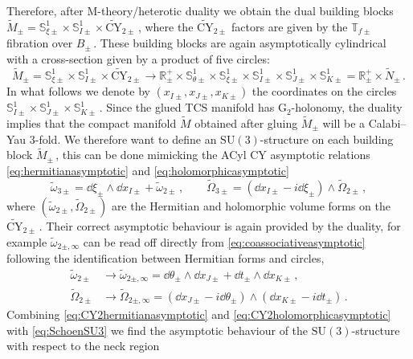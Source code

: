 \documentclass{pspum-l}
\newcommand*\Sc{\mathbb{S}}
\newcommand*\R{\mathbb{R}}
\theoremstyle{definition}
\theoremstyle{remark}
\numberwithin{equation}{section}
\begin{document}
Therefore, after M-theory/heterotic duality we obtain the dual building blocks $\widetilde{M}_\pm = \Sc^1_{\xi\pm}\times \Sc^1_{I\pm} \times \widetilde{\text{CY}}_{2\pm} \,$, where the $\widetilde{\text{CY}}_{2\pm}$ factors are given by the $\mathbb{T}_{f\pm}$ fibration over $B_\pm\,$. These building blocks are again asymptotically cylindrical with a cross-section given by a product of five circles:
\begin{equation}
    \widetilde{M}_\pm = \Sc^1_{\xi\pm}\times \Sc^1_{I\pm} \times \widetilde{\text{CY}}_{2\pm} \longrightarrow \R^+_\pm\times\Sc^1_{\theta\pm}\times\Sc^1_{\xi\pm}\times\Sc^1_{I\pm}\times\Sc^1_{J\pm}\times\Sc^1_{K\pm}= \R^+_\pm\times \widetilde{N}_\pm \, .
\end{equation}
In what follows we denote by $(x_{I\pm},x_{J\pm},x_{K\pm})$ the coordinates on the circles $\Sc^1_{I\pm}\times\Sc^1_{J\pm}\times\Sc^1_{K\pm}\,$. Since the glued TCS manifold has G$_2$-holonomy, the duality implies that the compact manifold $\widetilde{M}$ obtained after gluing $\widetilde{M}_\pm$ will be a Calabi--Yau 3-fold. We therefore want to define an $\text{SU}(3)$-structure on each building block $\widetilde{M}_\pm\,$, this can be done mimicking the ACyl CY asymptotic relations \eqref{eq:hermitianasymptotic} and \eqref{eq:holomorphicasymptotic}
\begin{equation}
\label{eq:SchoenSU3}
    \widetilde{\omega}_{3\pm}=\dd\xi_\pm\wedge\dd x_{I\pm} + \widetilde{\omega}_{2\pm} \, , \qquad  \widetilde{\Omega}_{3\pm}=(\dd x_{I\pm}-i\dd\xi_\pm)\wedge\widetilde{\Omega}_{2\pm} \, ,
\end{equation}
where $(\widetilde{\omega}_{2\pm} , \widetilde{\Omega}_{2\pm} )$ are the Hermitian and holomorphic volume forms on the $\widetilde{\text{CY}}_{2\pm}\,$. Their correct asymptotic behaviour is again provided by the duality, for example $\widetilde{\omega}_{2\pm,\infty}$ can be read off directly from \eqref{eq:coassociativeasymptotic} following the identification between Hermitian forms and circles,
\begin{align}
    \label{eq:CY2hermitianasymptotic}
    \widetilde{\omega}_{2\pm} & \longrightarrow \widetilde{\omega}_{2\pm,\infty}=\dd\theta_\pm\wedge\dd x_{J\pm}+\dd t_\pm\wedge\dd x_{K\pm} \, ,\\
    \label{eq:CY2holomorphicasymptotic}
    \widetilde{\Omega}_{2\pm} & \longrightarrow \widetilde{\Omega}_{2\pm,\infty}=(\dd  x_{J\pm}-i\dd\theta_\pm)\wedge(\dd x_{K\pm}-i\dd t_\pm) \, .
\end{align}
Combining \eqref{eq:CY2hermitianasymptotic} and \eqref{eq:CY2holomorphicasymptotic} with \eqref{eq:SchoenSU3} we find the asymptotic behaviour of the $\text{SU}(3)$-structure with respect to the neck region
\end{document}
